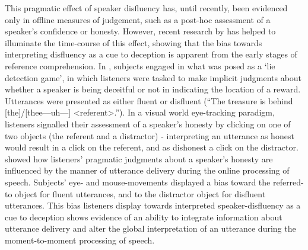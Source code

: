 \documentclass[a4paper,man,natbib]{apa6}
\begin{document}
This pragmatic effect of speaker disfluency has, until recently, been evidenced only in offline measures of judgement, such as a post-hoc assessment of a speaker's confidence or honesty. 
However, recent research by \citeauthor{Loy2016} has helped to illuminate the time-course of this effect, showing that the bias towards interpreting disfluency as a cue to deception is apparent from the early stages of reference comprehension. 
In \citet{Loy2016}, subjects engaged in what was posed as a `lie detection game', in which listeners were tasked to make implicit judgments about whether a speaker is being deceitful or not in indicating the location of a reward.
Utterances were presented as either fluent or disfluent (``The treasure is behind [the]/[thee---uh---] \textless referent\textgreater .'').
In a visual world eye-tracking paradigm, listeners signalled their assessment of a speaker's honesty by clicking on one of two objects (the referent and a distractor) - interpreting an utterance as honest would result in a click on the referent, and as dishonest a click on the distractor.
\citeauthor{Loy2016} showed how listeners' pragmatic judgments about a speaker's honesty are influenced by the manner of utterance delivery during the online processing of speech.
Subjects' eye- and mouse-movements displayed a bias toward the referred-to object for fluent utterances, and to the distractor object for disfluent utterances. 
This bias listeners display towards interpreted speaker-disfluency as a cue to deception shows evidence of an ability to integrate information about utterance delivery and alter the global interpretation of an utterance during the moment-to-moment processing of speech.











\end{document}
